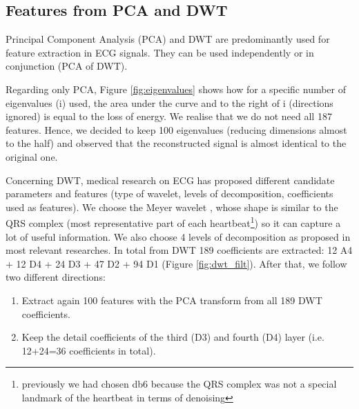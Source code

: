 \documentclass[a4paper,10pt,twocolumn]{article}
\begin{document}


\subsection{Features from PCA and DWT}
\label{sec:4.4}
Principal Component Analysis (PCA) and DWT are predominantly used for feature extraction in ECG signals. They can be used independently or in conjunction (PCA of DWT).

Regarding only PCA, Figure \ref{fig:eigenvalues} shows how for a specific number of eigenvalues (i) used, the area under the curve and to the right of i (directions ignored) is equal to the loss of energy. We realise that we do not need all 187 features. Hence, we decided to keep 100 eigenvalues (reducing dimensions almost to the half) and observed that the reconstructed signal is almost identical to the original one.

Concerning DWT, medical research on ECG has proposed different candidate parameters and features (type of wavelet, levels of decomposition, coefficients used as features). We choose the Meyer wavelet \cite{meyer1990ondelettes}, whose shape is similar to the QRS complex (most representative part of each heartbeat\footnote{previously we had chosen db6 because the QRS complex was not a special landmark of the heartbeat in terms of denoising}) so it can capture a lot of useful information. We also choose 4 levels of decomposition as proposed in most relevant researches. In total from DWT 189 coefficients are extracted: 12 A4 + 12 D4 + 24 D3 + 47 D2 + 94 D1 (Figure \ref{fig:dwt_filt}). After that, we follow two different directions:
\begin{enumerate}
  \item Extract again 100 features with the PCA transform from all 189 DWT coefficients.
 \item Keep the detail coefficients of the third (D3) and fourth (D4) layer (i.e. 12+24=36 coefficients in total).
\end{enumerate}
\end{document}
